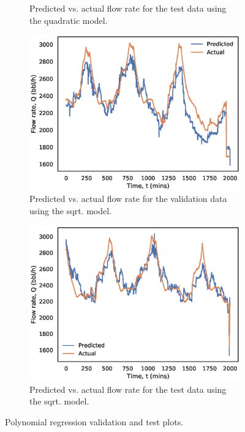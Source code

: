\begin{figure}[h]
\begin{subfigure}[b]{0.45\textwidth}
         \caption{Predicted vs. actual flow rate for the test data using the quadratic model.}
         \label{fig:08quad_test}
     \end{subfigure}
     \begin{subfigure}[b]{0.45\textwidth}
         \centering
         \includegraphics[width=\textwidth]{images/suncor/08sqrt_validation.eps}
         \caption{Predicted vs. actual flow rate for the validation data using the sqrt. model.}
         \label{fig:08sqrt_validation}
     \end{subfigure}
     \begin{subfigure}[b]{0.45\textwidth}
         \centering
         \includegraphics[width=\textwidth]{images/suncor/08sqrt_test.eps}
         \caption{Predicted vs. actual flow rate for the test data using the sqrt. model.}
         \label{fig:08sqrt_test}
     \end{subfigure}
        \caption{Polynomial regression validation and test plots.}
        \label{fig:08PolynomialPlots}
\end{figure}

